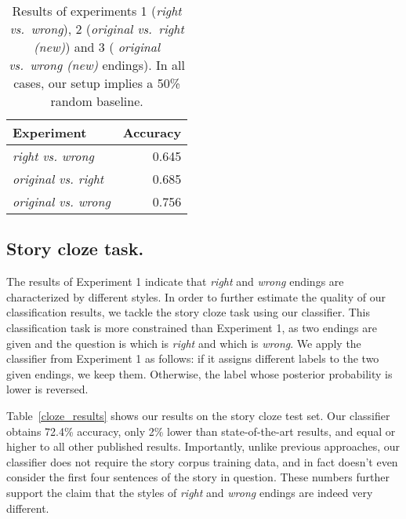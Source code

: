 \documentclass[11pt,a4paper]{article}
\newcommand{\tabref}[1]{Table~\ref{#1}}
\newcommand{\com}[1]{}
\newcommand{\resolved}[1]{}
\newcommand{\roy}[1]{{\color{orange}\textsc{[#1 --rs]}}}
\newcommand{\nascomment}[1]{{\color{blue}\textsc{[#1 --nas]}}}
\renewcommand{\roy}[1]{{\color{orange}[#1 --rs]}}
\renewcommand{\roy}[1]{#1}
\renewcommand{\nascomment}[1]{}
\begin{document}
\begin{table}[!t]
\begin{center}
\begin{tabular}{|l|r|} \hline
{\bf Experiment} & {\bf Accuracy} \\ \hline
{\sl right vs. wrong} & 0.645 \\ \hline
{\sl original vs. right} & 0.685 \\ \hline
{\sl original vs. wrong} & 0.756 \\ \hline
\end{tabular}
\end{center}
\caption{\label{results}Results of  experiments 1 ({\it right vs.~wrong}), 2 ({\it original vs.~right (new)}) and 3 ({\it
  original vs.~wrong (new)} endings).
In all cases, our setup implies a 50\% random baseline.}
\end{table}

\subsection{Story cloze task.}
The results of Experiment 1 indicate that {\it right} and {\it wrong} endings are characterized by different styles.
In order to further estimate the quality of our classification results, we tackle the story cloze task using our classifier.
This classification task is more constrained than Experiment 1, as two
endings are given and the question is which is \emph{right} and which is
\emph{wrong}.
We apply the classifier from Experiment 1 as follows:
if it assigns different labels to the two given endings, we keep
them.  Otherwise, the label whose posterior probability is lower is reversed.

\tabref{cloze_results} shows our results on the story cloze test
set. Our classifier obtains 72.4\% accuracy, \roy{only 2\% lower than state-of-the-art results, and equal or higher to all other published results}\com{12.5\% (absolute) higher than the
published state-of-the-art result on the task \cite{Salle:2016}}\resolved{\nascomment{cite that here}}.
Importantly, unlike previous approaches, our classifier does not require the story corpus training data, and in fact doesn't even consider the first four sentences of the story in question.
These numbers further support the claim that the styles of {\it right} and {\it wrong} endings are indeed very different.
\end{document}
